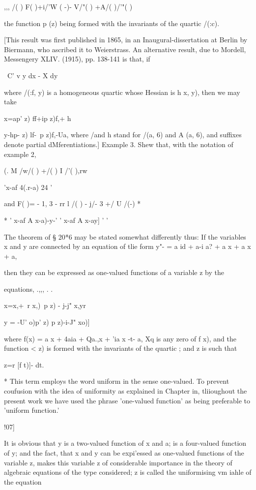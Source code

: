 {,,, /( ) F( )+i/'W ( -)- V/"( ) +A/( )/'"( )

the function p (z) being formed with the invariants of the quartic
/(:c).


[This result was first published in 1865, in an Inaugural-dissertation
at Berlin by Biermann, who ascribed it to Weierstrass. An alternative
result, due to Mordell, Messengery XLIV. (1915), pp. 138-141 is that,
if

\ C' v y dx - X dy

where /(:f, y) is a homogeneous quartic whose Hessian is h x, y), then
we may take

x=ap' z) ff+ip z)f,+ h

y-hp- z) lf-\ p z)f,-Ua, where /and h stand for /(a, 6) and A (a, 6),
and suffixes denote partial dMferentiations.] Example 3. Shew that,
with the notation of example 2,

(. M /w/( ) +/( ) I /'( ),rw

 'x-af 4(.r-a) 24 '

and F( )= - 1, 3 - rr l /( ) - j/- 3 +/ U /(-) *

* ' x-af A x-a)-y-' ' x-af A x-ay] ' '

The theorem of §
20*6 may be stated somewhat differently thus: If the variables x and
y are connected by an equation of tlie form y"- = a id + a-i a? + a x
+ a x + a,

then they can be expressed as one-valued functions of a variable z by
the

equations, .,,, . .

  x=x,+\ r x,)\ p z) - j-j" x,yr

y = -U' o)p' z) p z)-i-J" xo)]

where f(x) = a x + 4aia + Qa.,x + 'ia x -t- a, Xq is any zero of f
x), and the function < z) is formed with the invariants of the quartic
; and z is such that

z=r [f t)]- dt.

* This term employs the word uniform in the sense one-valued. To
prevent coufusion with the idea of uniformity as explained in Chapter
in, tliioughout the present work we have used the phrase 'one-valued
function' as being preferable to 'uniform function.'

!07]

%
%

It is obvious that y is a two-valued function of x and a; is a
four-valued function of y; and the fact, that x and y can be
expi'essed as one-valued functions of the variable z, makes this
variable z of considerable importance in the theory of algebraic
equations of the type considered; z is called the uniformising vm
iahle of the equation

}
